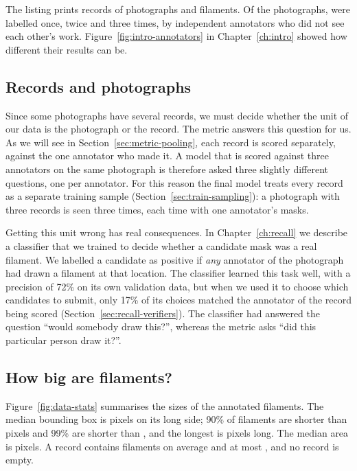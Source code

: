 The listing prints \AllRecords{} records of \AllPhotos{} photographs and \AllFilaments{}
filaments. Of the photographs, \OnceAnnotated{} were labelled once, \TwiceAnnotated{} twice and
\ThriceAnnotated{} three times, by independent annotators who did not see each other's work.
Figure~\ref{fig:intro-annotators} in Chapter~\ref{ch:intro} showed how different their results
can be.

\subsection{Records and photographs}\label{sec:data-records}
Since some photographs have several records, we must decide whether the unit of our data is the
photograph or the record. The metric answers this question for us. As we will see in
Section~\ref{sec:metric-pooling}, each record is scored separately, against the one annotator who
made it. A model that is scored against three annotators on the same photograph is therefore
asked three slightly different questions, one per annotator. For this reason the final model
treats every record as a separate training sample (Section~\ref{sec:train-sampling}): a
photograph with three records is seen three times, each time with one annotator's masks.

Getting this unit wrong has real consequences. In Chapter~\ref{ch:recall} we describe a
classifier that we trained to decide whether a candidate mask was a real filament. We labelled a
candidate as positive if \emph{any} annotator of the photograph had drawn a filament at that
location. The classifier learned this task well, with a precision of 72\% on its own validation
data, but when we used it to choose which candidates to submit, only 17\% of its choices matched
the annotator of the record being scored (Section~\ref{sec:recall-verifiers}). The classifier had
answered the question ``would somebody draw this?'', whereas the metric asks ``did this particular
person draw it?''.

\subsection{How big are filaments?}\label{sec:data-sizes}
Figure~\ref{fig:data-stats} summarises the sizes of the annotated filaments. The median bounding
box is \LongPfifty{} pixels on its long side; 90\% of filaments are shorter than \LongPninety{}
pixels and 99\% are shorter than \LongPninetynine{}, and the longest is \LongMax{} pixels long.
The median area is \AreaMedian{} pixels. A record contains \MeanPerRecord{} filaments on average
and at most \MaxPerRecord{}, and no record is empty.

